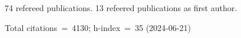 74 refereed publications. 13 refeered publications as first author.

Total citations~=~4130; h-index~=~35 (2024-06-21)